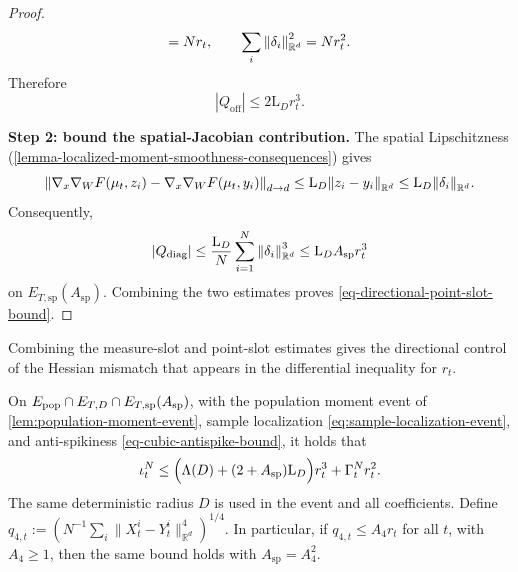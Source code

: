 \begin{proof}
\[    =Nr_t,
    \qquad
    \sum_i\norm{\delta_i}_{\mathbb R^d}^2=Nr_t^2.
\]
Therefore
\begin{equation}
    |Q_{\mathrm{off}}|
    \le
    2\mathrm L_Dr_t^3.
\end{equation}
\par\noindent\textbf{Step 2: bound the spatial-Jacobian contribution.}
The spatial Lipschitzness (\cref{lemma-localized-moment-smoothness-consequences}) gives
\begin{equation}
    \norm{
        \nabla_x\nabla_WF(\mu_t,z_i)-
        \nabla_x\nabla_WF(\mu_t,y_i)
    }_{{d}\to{d}}
    \le
    \mathrm L_D\norm{z_i-y_i}_{\mathbb R^d}
    \le
    \mathrm L_D\norm{\delta_i}_{\mathbb R^d}.
\end{equation}
Consequently,
\begin{equation}
    |Q_{\mathrm{diag}}|
    \le
    \frac{\mathrm L_D}{N}\sum_{i=1}^N\norm{\delta_i}_{\mathbb R^d}^3
    \le
    \mathrm L_DA_{\mathrm{sp}}r_t^3
\end{equation}
on \(E_{T,\mathrm{sp}}(A_{\mathrm{sp}})\). Combining the two estimates proves
\cref{eq-directional-point-slot-bound}.
\end{proof}

Combining the measure-slot and point-slot estimates gives the directional control of the Hessian mismatch that appears in the differential inequality for \(r_t\).

\begin{corollary}
\label{corollary-bound-iota-combined}
On $E_{\rm pop}\cap E_{T,D}\cap E_{T,\mathrm{sp}}(A_{\mathrm{sp}})$,
with the population moment event of \cref{lem:population-moment-event},
sample localization \eqref{eq:sample-localization-event}, and
anti-spikiness \eqref{eq-cubic-antispike-bound}, it holds that
\begin{equation}
\label{eq-iota-combined-bound}
    \iota_t^N
    \le
    \Bigl(\Lambda(D)+(2+A_{\mathrm{sp}})\mathrm L_D\Bigr)r_t^3
    +
    \Gamma_t^Nr_t^2.
\end{equation}
The same deterministic radius $D$ is used in the event and all coefficients.
Define $q_{4,t}:=(N^{-1}\sum_i\|X_t^i-Y_t^i\|_{\mathbb R^d}^4)^{1/4}$. In particular, if \(q_{4,t}\le A_4r_t\) for all \(t\), with $A_4\ge1$, then the same bound holds with
\(A_{\mathrm{sp}}=A_4^2\).
\end{corollary}

